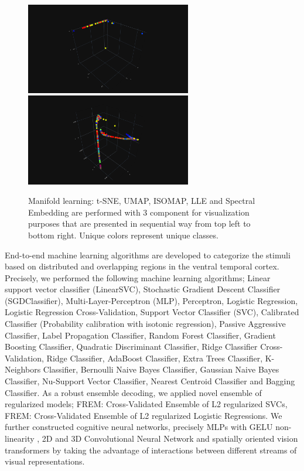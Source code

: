 \documentclass[10pt, twocolumn, letterpaper]{article}
\begin{document}
\begin{figure}
    \\[\smallskipamount]
    \includegraphics[width=.5\linewidth, height=4cm,  valign=c]{images/lle_3d.png}
    \includegraphics[width=.5\linewidth, height=4cm,  valign=c]{images/SpectralEmbedding_3d.png}
    \caption{Manifold learning: t-SNE, UMAP, ISOMAP, LLE and Spectral Embedding are performed with 3 component for visualization purposes that are presented in sequential way from top left to bottom right. Unique colors represent unique classes.}\label{fig:man}
\end{figure}


End-to-end machine learning algorithms are developed to categorize the stimuli based on distributed and overlapping regions in the ventral temporal cortex. Precisely, we performed the following machine learning algorithms; Linear support vector classifier (LinearSVC), Stochastic Gradient Descent Classifier (SGDClassifier), Multi-Layer-Perceptron (MLP), Perceptron, Logistic Regression, Logistic Regression Cross-Validation, Support Vector Classifier (SVC), Calibrated Classifier (Probability calibration with isotonic regression), Passive Aggressive Classifier, Label Propagation Classifier, Random Forest Classifier, Gradient Boosting Classifier, Quadratic Discriminant Classifier, Ridge Classifier Cross-Validation, Ridge Classifier, AdaBoost Classifier, Extra Trees Classifier, K-Neighbors Classifier, Bernoulli Naive Bayes Classifier, Gaussian Naive Bayes Classifier, Nu-Support Vector Classifier, Nearest Centroid Classifier and Bagging Classifier. As a robust ensemble decoding, we applied novel ensemble of regularized models; FREM: Cross-Validated Ensemble of L2 regularized SVCs, FREM: Cross-Validated Ensemble of L2 regularized Logistic Regressions. We further constructed cognitive neural networks, precisely MLPs with GELU non-linearity \cite{hendrycks2020gaussian}, 2D and 3D  Convolutional Neural Network and spatially oriented vision transformers by taking the advantage of interactions between different streams of visual representations.
\end{document}
